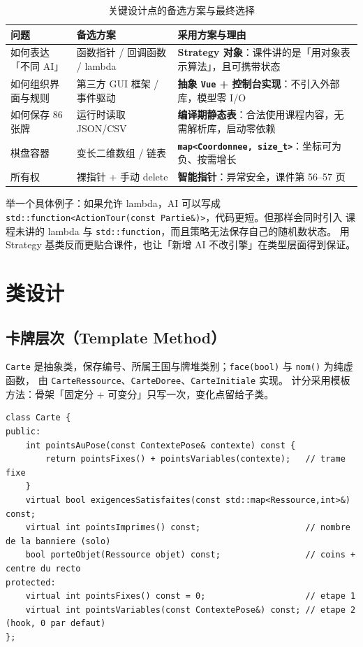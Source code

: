 \documentclass[11pt,a4paper]{ctexart}
\newcommand{\cl}[1]{\texttt{#1}}
\begin{document}
\begin{table}[h]
\centering
\small
\begin{tabular}{p{4.1cm}p{4.3cm}p{6.2cm}}
\toprule
问题 & 备选方案 & 采用方案与理由 \\
\midrule
如何表达「不同 AI」 & 函数指针 / 回调函数 / lambda & \textbf{Strategy 对象}：\newline 课件讲的是「用对象表示算法」，且可携带状态 \\
如何组织界面与规则 & 第三方 GUI 框架 / 事件驱动 & \textbf{抽象 \cl{Vue} + 控制台实现}：\newline 不引入外部库，模型零 I/O \\
如何保存 86 张牌 & 运行时读取 JSON/CSV & \textbf{编译期静态表}：\newline 合法使用课程内容，无需解析库，启动零依赖 \\
棋盘容器 & 变长二维数组 / 链表 & \textbf{\cl{map<Coordonnee, size\_t>}}：\newline 坐标可为负、按需增长 \\
所有权 & 裸指针 + 手动 delete & \textbf{智能指针}：\newline 异常安全，课件第 56--57 页 \\
\bottomrule
\end{tabular}
\caption{关键设计点的备选方案与最终选择}
\label{tab:choix}
\end{table}

举一个具体例子：如果允许 lambda，AI 可以写成
\cl{std::function<ActionTour(const Partie\&)>}，代码更短。但那样会同时引入
课程未讲的 lambda 与 \cl{std::function}，而且策略无法保存自己的随机数状态。
用 Strategy 基类反而更贴合课件，也让「新增 AI 不改引擎」在类型层面得到保证。

\section{类设计}

\subsection{卡牌层次（Template Method）}
\cl{Carte} 是抽象类，保存编号、所属王国与牌堆类别；\cl{face(bool)} 与 \cl{nom()} 为纯虚函数，
由 \cl{CarteRessource}、\cl{CarteDoree}、\cl{CarteInitiale} 实现。
计分采用模板方法：骨架「固定分 + 可变分」只写一次，变化点留给子类。

\begin{lstlisting}
class Carte {
public:
    int pointsAuPose(const ContextePose& contexte) const {
        return pointsFixes() + pointsVariables(contexte);   // trame fixe
    }
    virtual bool exigencesSatisfaites(const std::map<Ressource,int>&) const;
    virtual int pointsImprimes() const;                     // nombre de la banniere (solo)
    bool porteObjet(Ressource objet) const;                 // coins + centre du recto
protected:
    virtual int pointsFixes() const = 0;                    // etape 1
    virtual int pointsVariables(const ContextePose&) const; // etape 2 (hook, 0 par defaut)
};
\end{lstlisting}
\end{document}
